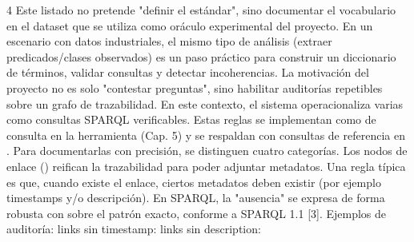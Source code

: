 \markdownRendererPipe{} 4 \markdownRendererPipe{}\markdownRendererInterblockSeparator
{}Este listado no pretende "definir el estándar", sino documentar el vocabulario  en el dataset que se utiliza como oráculo experimental del proyecto. En un escenario con datos industriales, el mismo tipo de análisis (extraer predicados/clases observados) es un paso práctico para construir un diccionario de términos, validar consultas y detectar incoherencias.\markdownRendererInterblockSeparator
{}\markdownRendererInterblockSeparator
{}La motivación del proyecto no es solo "contestar preguntas", sino habilitar auditorías repetibles sobre un grafo de trazabilidad. En este contexto, el sistema operacionaliza varias  como consultas SPARQL verificables. Estas reglas se implementan como  de consulta en la herramienta (Cap. 5) y se respaldan con consultas de referencia en .\markdownRendererInterblockSeparator
{}Para documentarlas con precisión, se distinguen cuatro categorías.\markdownRendererInterblockSeparator
{} Los nodos de enlace () reifican la trazabilidad para poder adjuntar metadatos. Una regla típica es que, cuando existe el enlace, ciertos metadatos deben existir (por ejemplo timestamps y/o descripción). En SPARQL, la "ausencia" se expresa de forma robusta con  sobre el patrón exacto, conforme a SPARQL 1.1 [3].\markdownRendererInterblockSeparator
{}\markdownRendererUlBeginTight
\markdownRendererUlItem Ejemplos de auditoría:\markdownRendererInterblockSeparator
{}\markdownRendererUlBeginTight
\markdownRendererUlItem links sin timestamp: \markdownRendererUlItemEnd 
\markdownRendererUlItem links sin description: \markdownRendererUlItemEnd 
\markdownRendererUlEndTight \markdownRendererUlItemEnd 
\markdownRendererUlEndTight \markdownRendererInterblockSeparator

